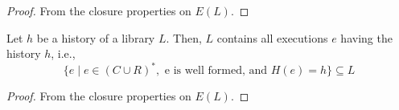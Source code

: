\begin{proof}

  From the closure properties on $E(L)$.

\end{proof}

\begin{lemma}\label{lemma:lib_exec}
  
Let $h$ be a history of a library $L$. Then, $L$ contains all executions $e$ having the history $h$, i.e., 
\[
\{e\mid e\in (C\cup R)^*,\mbox{ e is well formed, and }H(e)=h\}\subseteq L
\]

\end{lemma}

\begin{proof}

  From the closure properties on $E(L)$.

\end{proof}




